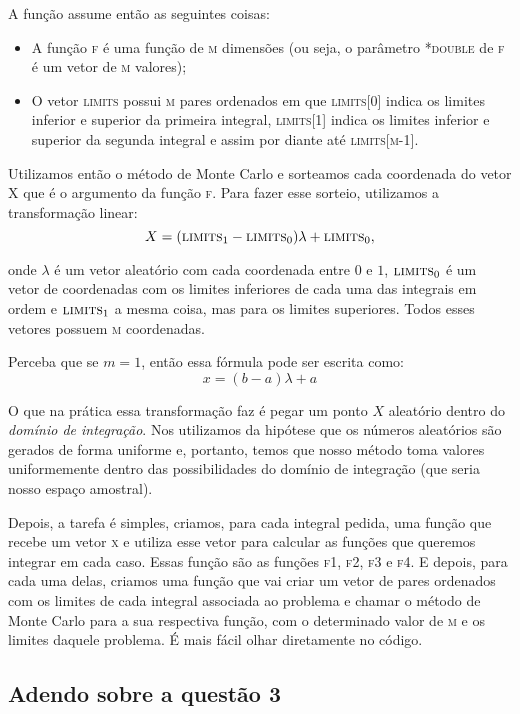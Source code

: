 \documentclass[12pt, a4paper, oneside]{article}
\begin{document}
A função assume então as seguintes coisas: 
\begin{itemize}
\item A função \textsc{f} é uma função de 
\textsc{m} dimensões (ou seja, o parâmetro \textsc{*double} de \textsc{f} é um
vetor de \textsc{m} valores);
\item O vetor \textsc{limits} possui \textsc{m} pares ordenados em que 
\textsc{limits[0]} indica os limites inferior e superior da primeira integral,
\textsc{limits[1]} indica os limites inferior e superior da segunda integral
e assim por diante até \textsc{limits[m-1]}.
\end{itemize}

Utilizamos então o método de Monte Carlo e sorteamos cada coordenada do vetor
\textsc{X} que é o argumento da função \textsc{f}. Para fazer esse sorteio, 
utilizamos a transformação linear:
$$X=(\textsc{limits}_1-\textsc{limits}_0)\lambda+\textsc{limits}_0,$$

onde $\lambda$ é um vetor aleatório com cada coordenada 
entre $0$ e $1$, $\textsc{limits}_0$ é um vetor de coordenadas com os limites 
inferiores de cada uma das integrais em ordem e $\textsc{limits}_1$ a mesma coisa,
mas para os limites superiores. Todos esses vetores possuem \textsc{m} coordenadas.

Perceba que se $m=1$, então essa fórmula pode ser escrita como:
$$x=(b-a)\lambda+a$$

O que na prática essa transformação faz é pegar um ponto $X$ aleatório dentro 
do \textit{domínio de integração}. Nos utilizamos da hipótese que os números
aleatórios são gerados de forma uniforme e, portanto, temos que nosso método 
toma valores uniformemente dentro das possibilidades do domínio de integração
(que seria nosso espaço amostral).

Depois, a tarefa é simples, criamos, para cada integral pedida, uma função
que recebe um vetor \textsc{x} e utiliza esse vetor para calcular as funções
que queremos integrar em cada caso. Essas função são as funções
\textsc{f1}, \textsc{f2}, \textsc{f3} e \textsc{f4}. E depois, para cada 
uma delas, criamos uma função que vai criar um vetor de pares ordenados com 
os limites de cada integral associada ao problema e chamar o método 
de Monte Carlo para a sua respectiva função, com o determinado valor 
de \textsc{m} e os limites daquele problema. É mais fácil olhar diretamente no
código.

\subsection*{Adendo sobre a questão 3}
\end{document}

